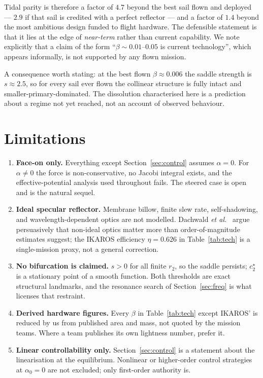 \documentclass[11pt,a4paper]{article}
\begin{document}
Tidal parity is therefore a factor of $4.7$ beyond the best sail flown and
deployed --- $2.9$ if that sail is credited with a perfect reflector --- and a
factor of $1.4$ beyond the most ambitious design funded to flight hardware.
The defensible statement is that it lies at the edge of \emph{near-term} rather
than current capability. We note explicitly that a claim of the form
``$\beta\sim0.01$--$0.05$ is current technology'', which appears informally, is
not supported by any flown mission.

A consequence worth stating: at the best flown $\beta\approx0.006$ the saddle
strength is $s\approx2.5$, so for every sail ever flown the collinear structure
is fully intact and smaller-primary-dominated. The dissolution characterised
here is a prediction about a regime not yet reached, not an account of observed
behaviour.

\section{Limitations}\label{sec:limits}

\begin{enumerate}
\item \textbf{Face-on only.} Everything except Section~\ref{sec:control} assumes
$\alpha=0$. For $\alpha\neq0$ the force is non-conservative, no Jacobi integral
exists, and the effective-potential analysis used throughout fails. The steered
case is open and is the natural sequel.

\item \textbf{Ideal specular reflector.} Membrane billow, finite slew rate,
self-shadowing, and wavelength-dependent optics are not modelled. Dachwald
\emph{et al.}~\cite{dachwald2013} argue persuasively that non-ideal optics matter
more than order-of-magnitude estimates suggest; the IKAROS efficiency
$\eta=0.626$ in Table~\ref{tab:tech} is a single-mission proxy, not a general
correction.

\item \textbf{No bifurcation is claimed.} $s>0$ for all finite $r_2$, so the
saddle persists; $c_2^\star$ is a stationary point of a smooth function. Both
thresholds are exact structural landmarks, and the resonance search of
Section~\ref{sec:freq} is what licenses that restraint.

\item \textbf{Derived hardware figures.} Every $\beta$ in Table~\ref{tab:tech}
except IKAROS' is reduced by us from published area and mass, not quoted by the
mission teams. Where a team publishes its own lightness number, prefer it.

\item \textbf{Linear controllability only.} Section~\ref{sec:control} is a
statement about the linearisation at the equilibrium. Nonlinear or
higher-order control strategies at $\alpha_0=0$ are not excluded; only
first-order authority is.
\end{enumerate}
\end{document}
